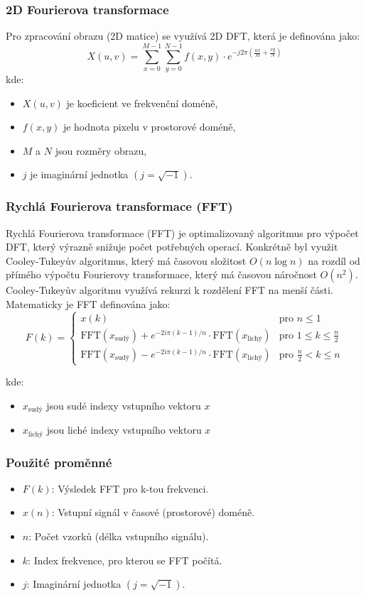 \subsubsection{2D Fourierova transformace}
Pro zpracování obrazu (2D matice) se využívá 2D DFT, která je definována jako:
\[
X(u, v) = \sum_{x=0}^{M-1} \sum_{y=0}^{N-1} f(x, y) \cdot e^{-j 2\pi \left( \frac{ux}{M} + \frac{vy}{N} \right)}
\]
kde:\begin{itemize}
    \item \( X(u, v) \) je koeficient ve frekvenční doméně,
    \item \( f(x, y) \) je hodnota pixelu v prostorové doméně,
    \item \( M \) a \( N \) jsou rozměry obrazu,
    \item \( j \) je imaginární jednotka \((j = \sqrt{-1})\).
\end{itemize}

\subsubsection{Rychlá Fourierova transformace (FFT)}
Rychlá Fourierova transformace (FFT) je optimalizovaný algoritmus pro výpočet DFT, který výrazně snižuje počet potřebných operací. Konkrétně byl využit Cooley-Tukeyův algoritmus, který má časovou složitost \( O(n \log n) \) na rozdíl od přímého výpočtu Fourierovy transformace, který má časovou náročnost \( O(n^2) \). Cooley-Tukeyův algoritmu využívá rekurzi k rozdělení FFT na menší části.\cite{CooleyTukeyFFTWiki} Matematicky je FFT definována jako:
\[
F(k) = \begin{cases} 
x(k) & \text{pro } n \leq 1 \\
\text{FFT}(x_{\text{sudý}}) + e^{-2i\pi(k-1)/n} \cdot \text{FFT}(x_{\text{lichý}}) & \text{pro } 1 \leq k \leq \frac{n}{2} \\
\text{FFT}(x_{\text{sudý}}) - e^{-2i\pi(k-1)/n} \cdot \text{FFT}(x_{\text{lichý}}) & \text{pro } \frac{n}{2} < k \leq n
\end{cases}
\]

kde:\begin{itemize}
    \item \( x_{\text{sudý}} \) jsou sudé indexy vstupního vektoru \( x \)
    \item \( x_{\text{lichý}} \) jsou liché indexy vstupního vektoru \( x \)
\end{itemize}

\subsubsection{Použité proměnné}
\begin{itemize}
    \item \( F(k) \): Výsledek FFT pro k-tou frekvenci.
    \item \( x(n) \): Vstupní signál v časové (prostorové) doméně.
    \item \( n \): Počet vzorků (délka vstupního signálu).
    \item \( k \): Index frekvence, pro kterou se FFT počítá.
    \item \( j \): Imaginární jednotka \((j = \sqrt{-1})\).
\end{itemize}

